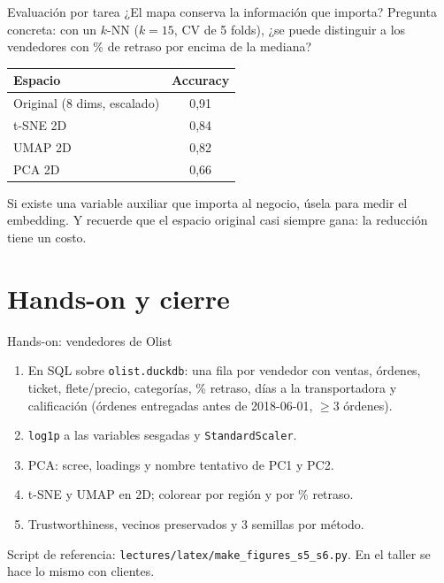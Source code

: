 \documentclass[aspectratio=169,12pt]{beamer}
\newcommand{\hrow}{\rowcolor{mlcream}}
\begin{document}
\begin{frame}{Evaluación por tarea}
  \small ¿El mapa conserva la información que importa? Pregunta concreta: con un $k$-NN ($k=15$, CV de 5 folds), ¿se puede distinguir a los vendedores con \% de retraso por encima de la mediana?\par
  \vspace{4pt}
  \centering
  \begin{tabular}{@{}l c@{}}
    \toprule
    \hrow \textbf{Espacio} & \textbf{Accuracy} \\
    \midrule
    Original (8 dims, escalado) & 0,91 \\
    t-SNE 2D & 0,84 \\
    UMAP 2D & 0,82 \\
    PCA 2D & 0,66 \\
    \bottomrule
  \end{tabular}
  \raggedright
  \begin{keybox}
    \small Si existe una variable auxiliar que importa al negocio, úsela para medir el embedding. Y recuerde que el espacio original casi siempre gana: la reducción tiene un costo.
  \end{keybox}
\end{frame}

\section{Hands-on y cierre}

\begin{frame}{Hands-on: vendedores de Olist}
  \begin{taskbox}
    \small
    \begin{enumerate}
      \item En SQL sobre \texttt{olist.duckdb}: una fila por vendedor con ventas, órdenes, ticket, flete/precio, categorías, \% retraso, días a la transportadora y calificación (órdenes entregadas antes de 2018-06-01, $\geq 3$ órdenes).
      \item \texttt{log1p} a las variables sesgadas y \texttt{StandardScaler}.
      \item PCA: scree, loadings y nombre tentativo de PC1 y PC2.
      \item t-SNE y UMAP en 2D; colorear por región y por \% retraso.
      \item Trustworthiness, vecinos preservados y 3 semillas por método.
    \end{enumerate}
  \end{taskbox}
  \footnotesize\color{mlgray} Script de referencia: \texttt{lectures/latex/make\_figures\_s5\_s6.py}. En el taller se hace lo mismo con clientes.
\end{frame}
\end{document}
